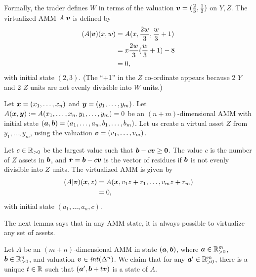 Formally, the trader defines $W$ in terms of the valuation
${\boldsymbol v} = (\frac{2}{3},\frac{1}{3})$ on $Y,Z$.
The virtualized AMM $A|{\boldsymbol v}$ is defined by
\begin{align*}
  (A|{\boldsymbol v})(x,w) 
  &= A(x,\frac{2w}{3},\frac{w}{3}+1)\\
  &= x \frac{2w}{3}(\frac{w}{3}+1) - 8 \\
  &= 0,
\end{align*}
with initial state $(2,3)$.
(The ``+1'' in the $Z$ co-ordinate appears
because 2 $Y$ and 2 $Z$ units are not evenly divisible
into $W$ units.)

Let ${\boldsymbol x} = (x_1, \ldots, x_n)$ and ${\boldsymbol y} = (y_1, \ldots, y_m)$.
Let $A({\boldsymbol x},{\boldsymbol y}) := A(x_1, \ldots, x_n,y_1,\ldots,y_m) = 0$ be an
$(n+m)$-dimensional AMM with initial state
$({\boldsymbol a},{\boldsymbol b}) = (a_1, \ldots, a_n, b_1, \ldots, b_m)$.
Let us create a virtual asset $Z$ from
$y_1, \ldots, y_m$,
using the valuation ${\boldsymbol v} = (v_1, \ldots, v_m)$.

Let $c \in \mathbb{R}_{>0}$ be the largest value such that
${\boldsymbol b} - c {\boldsymbol v} \geq {\boldsymbol 0}$.
The value $c$ is the number of $Z$ assets in ${\boldsymbol b}$,
and ${\boldsymbol r} ={\boldsymbol b} - c {\boldsymbol v}$ is the vector of residues
if ${\boldsymbol b}$ is not evenly divisible into $Z$ units.
The virtualized AMM is given by
\begin{align*}
(A|{\boldsymbol v})({\boldsymbol x},z) 
&= A({\boldsymbol x}, v_1 z + r_1, \ldots, v_m z + r_m) \\
&= 0,
\end{align*}
with initial state $(a_1, \ldots, a_n, c)$.

The next lemma says that in any AMM state,
it is always possible to virtualize any set of assets.
\begin{lemma}
  Let $A$ be an $(m+n)$-dimensional AMM in state $({\boldsymbol a},{\boldsymbol b})$,
  where ${\boldsymbol a} \in \mathbb{R}_{>0}^m$, ${\boldsymbol b} \in \mathbb{R}_{>0}^n$,
  and valuation ${\boldsymbol v} \in \mathit{int}(\Delta^n)$.
  We claim that for any ${\boldsymbol a}' \in \mathbb{R}_{>0}^m$,
  there is a unique $t \in \mathbb{R}$ such that $({\boldsymbol a}',{\boldsymbol b} + t {\boldsymbol v})$
  is a state of $A$.
\end{lemma}


